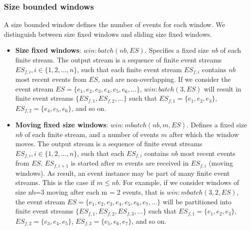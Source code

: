 \subsubsection{Size bounded windows}
A size bounded window defines the number of events for each window. We distinguish between size fixed windows and sliding size fixed windows.
\begin{itemize}
 \item \textbf{Size fixed windows}: $win:batch(nb, ES)$. Specifies a fixed size \textit{nb} of each finite stream. The output stream is a sequence of finite event streams $ES_{f,i}, i \in \{1, 2, …, n\}$, such that each finite event stream $ES_{f,i}$ contains $nb$ most recent events from $ES$, and are non-overlapping. If we consider the event stream $ES = \{e_1, e_2, e_3, e_4, e_5, e_6, …\}$, $win:batch(3, ES)$ will result in finite event streams $\{ES_{f,1}, ES_{f,2},...\}$ such that $ES_{f,1} = \{ e_1, e_2, e_3\}$, $ES_{f,2} = \{ e_4, e_5, e_6\}$, and so on. 

 \item \textbf{Moving fixed size windows}: $win:mbatch (nb, m, ES)$. Defines a fixed size $nb$ of each finite stream, and a number of events $m$ after which the window moves. The output stream is a sequence of finite event streams $ES_{f,i}, i \in \{1, 2, …, n\}$, such that each $ES_{f,i}$ contains $nb$ most recent events from $ES$. $ES_{f,i+1}$ is started after $m$ events are received in $ES_{f,i}$ (moving windows). As result, an event instance may be part of many finite event streams. This is the case if $m \leq nb$. For example, if we consider windows of size nb=3 moving after each m = 2 events, that is $win:mbatch (3, 2, ES)$, the event stream $ES = \{ e_1, e_2, e_3, e_4, e_5, e_6, e_7, …\}$ will be partitioned into finite event streams $\{ES_{f,1}, ES_{f,2}, ES_{f,3} , …\}$ such that $ES_{f,1}=\{e_1, e_2, e_3\}$, $ES_{f,2} = \{ e_3, e_4, e_5\}$, $ES_{f,3} = \{e_5, e_6, e_7\}$, and so on.
\end{itemize}

